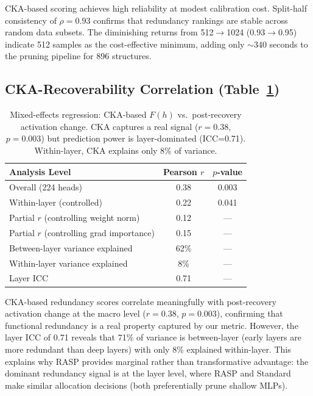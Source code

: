 \documentclass[11pt,a4paper]{article}
\begin{document}
CKA-based scoring achieves high reliability at modest calibration cost. Split-half consistency of $\rho = 0.93$ confirms that redundancy rankings are stable across random data subsets. The diminishing returns from 512$\rightarrow$1024 (0.93$\rightarrow$0.95) indicate 512 samples as the cost-effective minimum, adding only $\sim$340 seconds to the pruning pipeline for 896 structures.

\subsection{CKA-Recoverability Correlation (Table~\ref{tab:cka_corr})}

\begin{table}[t]
\centering
\small
\begin{tabular}{lcc}
\toprule
\textbf{Analysis Level} & \textbf{Pearson $r$} & \textbf{$p$-value} \\
\midrule
Overall (224 heads) & 0.38 & 0.003 \\
Within-layer (controlled) & 0.22 & 0.041 \\
\midrule
Partial $r$ (controlling weight norm) & 0.12 & --- \\
Partial $r$ (controlling grad importance) & 0.15 & --- \\
\midrule
Between-layer variance explained & 62\% & --- \\
Within-layer variance explained & 8\% & --- \\
Layer ICC & 0.71 & --- \\
\bottomrule
\end{tabular}
\caption{Mixed-effects regression: CKA-based $F(h)$ vs.\ post-recovery activation change. CKA captures a real signal ($r=0.38$, $p=0.003$) but prediction power is layer-dominated (ICC=0.71). Within-layer, CKA explains only 8\% of variance.}
\label{tab:cka_corr}
\end{table}

CKA-based redundancy scores correlate meaningfully with post-recovery activation change at the macro level ($r=0.38$, $p=0.003$), confirming that functional redundancy is a real property captured by our metric. However, the layer ICC of 0.71 reveals that 71\% of variance is between-layer (early layers are more redundant than deep layers) with only 8\% explained within-layer. This explains why RASP provides marginal rather than transformative advantage: the dominant redundancy signal is at the layer level, where RASP and Standard make similar allocation decisions (both preferentially prune shallow MLPs).
\end{document}

